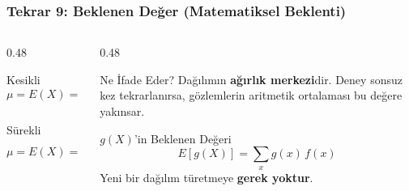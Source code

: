 \documentclass[light]{lutbeamer}
\begin{document}
\begin{frame}[fragile]
    \frametitle{Tekrar 9: Beklenen Değer (Matematiksel Beklenti)}
    \begin{columns}[T]
        \begin{column}{0.48\textwidth}
            \begin{block}{Kesikli}
                \[
                \mu = E(X) = \sum_x x\, f(x)
                \]
            \end{block}

            \begin{block}{Sürekli}
                \[
                \mu = E(X) = \int_{-\infty}^{\infty} x\, f(x)\, dx
                \]
            \end{block}
        \end{column}
        \begin{column}{0.48\textwidth}
            \begin{exampleblock}{Ne İfade Eder?}
                Dağılımın \textbf{ağırlık merkezi}dir. Deney sonsuz kez tekrarlanırsa, gözlemlerin aritmetik ortalaması bu değere yakınsar.
            \end{exampleblock}

            \begin{block}{$g(X)$'in Beklenen Değeri}
                \[
                E[g(X)] = \sum_x g(x)\, f(x)
                \]
                Yeni bir dağılım türetmeye \textbf{gerek yoktur}.
            \end{block}
        \end{column}
    \end{columns}
\end{frame}
\end{document}
